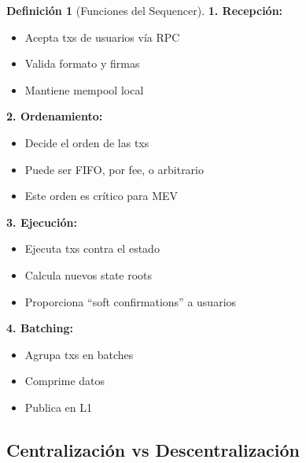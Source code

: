 \documentclass[11pt,a4paper,twoside,openright]{book}
\theoremstyle{definition}
\newtheorem{definition}{Definición}[chapter]
\theoremstyle{plain}
\theoremstyle{remark}
\begin{document}
\begin{definition}[Funciones del Sequencer]
\textbf{1. Recepción:}
\begin{itemize}
    \item Acepta txs de usuarios vía RPC
    \item Valida formato y firmas
    \item Mantiene mempool local
\end{itemize}

\textbf{2. Ordenamiento:}
\begin{itemize}
    \item Decide el orden de las txs
    \item Puede ser FIFO, por fee, o arbitrario
    \item Este orden es crítico para MEV
\end{itemize}

\textbf{3. Ejecución:}
\begin{itemize}
    \item Ejecuta txs contra el estado
    \item Calcula nuevos state roots
    \item Proporciona ``soft confirmations'' a usuarios
\end{itemize}

\textbf{4. Batching:}
\begin{itemize}
    \item Agrupa txs en batches
    \item Comprime datos
    \item Publica en L1
\end{itemize}
\end{definition}

\subsection{Centralización vs Descentralización}
\end{document}
